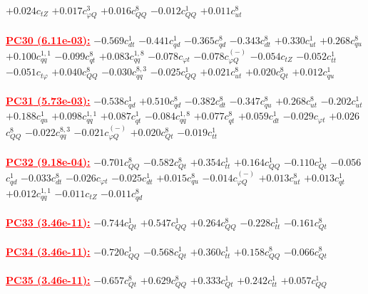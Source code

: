 \documentclass{article}
\begin{document}
{$+0.024$}{\rm $c_{tZ}$}
{$+0.017$}{\rm $c_{\varphi Q}^{3}$}
{$+0.016$}{\rm $c_{QQ}^{8}$}
{$-0.012$}{\rm $c_{QQ}^{1}$}
{$+0.011$}{\rm $c_{ut}^{8}$}
 \nonumber \\ \nonumber \\
\noindent \textcolor{red}{\underline{\bf{PC30} (6.11e-03):}}
{$-0.569$}{\rm $c_{dt}^{1}$}
{$-0.441$}{\rm $c_{qd}^{1}$}
{$-0.365$}{\rm $c_{qd}^{8}$}
{$-0.343$}{\rm $c_{dt}^{8}$}
{$+0.330$}{\rm $c_{ut}^{1}$}
{$+0.268$}{\rm $c_{qu}^{8}$}
{$+0.100$}{\rm $c_{qq}^{1,1}$}
{$-0.099$}{\rm $c_{qt}^{8}$}
{$+0.083$}{\rm $c_{qq}^{1,8}$}
{$-0.078$}{\rm $c_{\varphi t}$}
{$-0.078$}{\rm $c_{\varphi Q}^{(-)}$}
{$-0.054$}{\rm $c_{tZ}$}
{$-0.052$}{\rm $c_{tt}^{1}$}
{$-0.051$}{\rm $c_{t \varphi}$}
{$+0.040$}{\rm $c_{QQ}^{8}$}
{$-0.030$}{\rm $c_{qq}^{8,3}$}
{$-0.025$}{\rm $c_{QQ}^{1}$}
{$+0.021$}{\rm $c_{ut}^{8}$}
{$+0.020$}{\rm $c_{Qt}^{8}$}
{$+0.012$}{\rm $c_{qu}^{1}$}
 \nonumber \\ \nonumber \\
\noindent \textcolor{red}{\underline{\bf{PC31} (5.73e-03):}}
{$-0.538$}{\rm $c_{qd}^{1}$}
{$+0.510$}{\rm $c_{qd}^{8}$}
{$-0.382$}{\rm $c_{dt}^{8}$}
{$-0.347$}{\rm $c_{qu}^{8}$}
{$+0.268$}{\rm $c_{ut}^{8}$}
{$-0.202$}{\rm $c_{ut}^{1}$}
{$+0.188$}{\rm $c_{qu}^{1}$}
{$+0.098$}{\rm $c_{qq}^{1,1}$}
{$+0.087$}{\rm $c_{qt}^{1}$}
{$-0.084$}{\rm $c_{qq}^{1,8}$}
{$+0.077$}{\rm $c_{qt}^{8}$}
{$+0.059$}{\rm $c_{dt}^{1}$}
{$-0.029$}{\rm $c_{\varphi t}$}
{$+0.026$}{\rm $c_{QQ}^{8}$}
{$-0.022$}{\rm $c_{qq}^{8,3}$}
{$-0.021$}{\rm $c_{\varphi Q}^{(-)}$}
{$+0.020$}{\rm $c_{Qt}^{8}$}
{$-0.019$}{\rm $c_{tt}^{1}$}
 \nonumber \\ \nonumber \\
\noindent \textcolor{red}{\underline{\bf{PC32} (9.18e-04):}}
{$-0.701$}{\rm $c_{QQ}^{8}$}
{$-0.582$}{\rm $c_{Qt}^{8}$}
{$+0.354$}{\rm $c_{tt}^{1}$}
{$+0.164$}{\rm $c_{QQ}^{1}$}
{$-0.110$}{\rm $c_{Qt}^{1}$}
{$-0.056$}{\rm $c_{qd}^{1}$}
{$-0.033$}{\rm $c_{dt}^{8}$}
{$-0.026$}{\rm $c_{\varphi t}$}
{$-0.025$}{\rm $c_{dt}^{1}$}
{$+0.015$}{\rm $c_{qu}^{8}$}
{$-0.014$}{\rm $c_{\varphi Q}^{(-)}$}
{$+0.013$}{\rm $c_{ut}^{8}$}
{$+0.013$}{\rm $c_{qt}^{1}$}
{$+0.012$}{\rm $c_{qq}^{1,1}$}
{$-0.011$}{\rm $c_{tZ}$}
{$-0.011$}{\rm $c_{qd}^{8}$}
 \nonumber \\ \nonumber \\
\noindent \textcolor{red}{\underline{\bf{PC33} (3.46e-11):}}
{$-0.744$}{\rm $c_{Qt}^{1}$}
{$+0.547$}{\rm $c_{QQ}^{1}$}
{$+0.264$}{\rm $c_{QQ}^{8}$}
{$-0.228$}{\rm $c_{tt}^{1}$}
{$-0.161$}{\rm $c_{Qt}^{8}$}
 \nonumber \\ \nonumber \\
\noindent \textcolor{red}{\underline{\bf{PC34} (3.46e-11):}}
{$-0.720$}{\rm $c_{QQ}^{1}$}
{$-0.568$}{\rm $c_{Qt}^{1}$}
{$+0.360$}{\rm $c_{tt}^{1}$}
{$+0.158$}{\rm $c_{QQ}^{8}$}
{$-0.066$}{\rm $c_{Qt}^{8}$}
 \nonumber \\ \nonumber \\
\noindent \textcolor{red}{\underline{\bf{PC35} (3.46e-11):}}
{$-0.657$}{\rm $c_{Qt}^{8}$}
{$+0.629$}{\rm $c_{QQ}^{8}$}
{$+0.333$}{\rm $c_{Qt}^{1}$}
{$+0.242$}{\rm $c_{tt}^{1}$}
{$+0.057$}{\rm $c_{QQ}^{1}$}
 \nonumber \\ \nonumber \\
\end{document}
